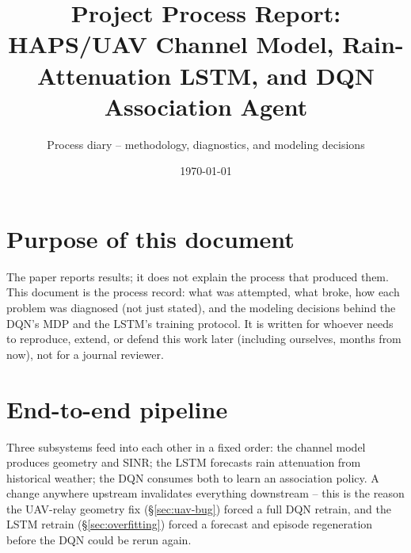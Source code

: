 \documentclass[11pt]{article}
\title{\textbf{Project Process Report:}\\
HAPS/UAV Channel Model, Rain-Attenuation LSTM, and DQN Association Agent}
\author{Process diary -- methodology, diagnostics, and modeling decisions}
\date{\today}
\newcommand{\block}[4]{\node[draw, rounded corners, fill=#4, minimum width=3.1cm, minimum height=1cm, align=center, font=\small] (#1) at #2 {#3};}
\begin{document}
\maketitle

\tableofcontents

\section{Purpose of this document}
The paper reports results; it does not explain the process that produced them. This
document is the process record: what was attempted, what broke, how each problem was
diagnosed (not just stated), and the modeling decisions behind the DQN's MDP and the
LSTM's training protocol. It is written for whoever needs to reproduce, extend, or
defend this work later (including ourselves, months from now), not for a journal
reviewer.

\section{End-to-end pipeline}
Three subsystems feed into each other in a fixed order: the channel model produces
geometry and SINR; the LSTM forecasts rain attenuation from historical weather; the
DQN consumes both to learn an association policy. A change anywhere upstream
invalidates everything downstream -- this is the reason the UAV-relay geometry fix
(\S\ref{sec:uav-bug}) forced a full DQN retrain, and the LSTM retrain
(\S\ref{sec:overfitting}) forced a forecast and episode regeneration before the DQN
could be rerun again.

\begin{center}
\end{center}
\end{document}
